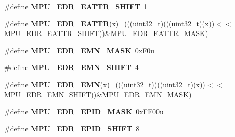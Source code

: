 \begin{DoxyCompactItemize}
\item 
\hypertarget{group___m_p_u___register___masks_gac76941d0d78453dcab7b06fc204a1abb}{}\#define {\bfseries M\+P\+U\+\_\+\+E\+D\+R\+\_\+\+E\+A\+T\+T\+R\+\_\+\+S\+H\+I\+F\+T}~1\label{group___m_p_u___register___masks_gac76941d0d78453dcab7b06fc204a1abb}

\item 
\hypertarget{group___m_p_u___register___masks_ga0f229cd86e20adbcced8b6a914bedd8a}{}\#define {\bfseries M\+P\+U\+\_\+\+E\+D\+R\+\_\+\+E\+A\+T\+T\+R}(x)                                              ~(((uint32\+\_\+t)(((uint32\+\_\+t)(x))$<$$<$M\+P\+U\+\_\+\+E\+D\+R\+\_\+\+E\+A\+T\+T\+R\+\_\+\+S\+H\+I\+F\+T))\&M\+P\+U\+\_\+\+E\+D\+R\+\_\+\+E\+A\+T\+T\+R\+\_\+\+M\+A\+S\+K)\label{group___m_p_u___register___masks_ga0f229cd86e20adbcced8b6a914bedd8a}

\item 
\hypertarget{group___m_p_u___register___masks_ga57901086814557690f671d195d886423}{}\#define {\bfseries M\+P\+U\+\_\+\+E\+D\+R\+\_\+\+E\+M\+N\+\_\+\+M\+A\+S\+K}~0x\+F0u\label{group___m_p_u___register___masks_ga57901086814557690f671d195d886423}

\item 
\hypertarget{group___m_p_u___register___masks_gad27c9ef1ae37201a6c16976311c5e1b3}{}\#define {\bfseries M\+P\+U\+\_\+\+E\+D\+R\+\_\+\+E\+M\+N\+\_\+\+S\+H\+I\+F\+T}~4\label{group___m_p_u___register___masks_gad27c9ef1ae37201a6c16976311c5e1b3}

\item 
\hypertarget{group___m_p_u___register___masks_ga96dd5486570e5f2b830023213e5bcefc}{}\#define {\bfseries M\+P\+U\+\_\+\+E\+D\+R\+\_\+\+E\+M\+N}(x)                                                  ~(((uint32\+\_\+t)(((uint32\+\_\+t)(x))$<$$<$M\+P\+U\+\_\+\+E\+D\+R\+\_\+\+E\+M\+N\+\_\+\+S\+H\+I\+F\+T))\&M\+P\+U\+\_\+\+E\+D\+R\+\_\+\+E\+M\+N\+\_\+\+M\+A\+S\+K)\label{group___m_p_u___register___masks_ga96dd5486570e5f2b830023213e5bcefc}

\item 
\hypertarget{group___m_p_u___register___masks_ga37328927ec3b6c036e4091cba2631af7}{}\#define {\bfseries M\+P\+U\+\_\+\+E\+D\+R\+\_\+\+E\+P\+I\+D\+\_\+\+M\+A\+S\+K}~0x\+F\+F00u\label{group___m_p_u___register___masks_ga37328927ec3b6c036e4091cba2631af7}

\item 
\hypertarget{group___m_p_u___register___masks_ga0cc03b3e200e7c9c27b3731305e7a007}{}\#define {\bfseries M\+P\+U\+\_\+\+E\+D\+R\+\_\+\+E\+P\+I\+D\+\_\+\+S\+H\+I\+F\+T}~8\label{group___m_p_u___register___masks_ga0cc03b3e200e7c9c27b3731305e7a007}


\end{DoxyCompactItemize}
